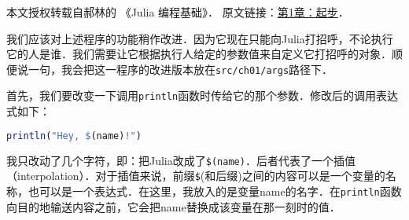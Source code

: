 
本文授权转载自郝林的 《Julia 编程基础》． 原文链接：\href{https://github.com/hyper0x/JuliaBasics/blob/master/book/ch01.md}{第1章：起步}．

我们应该对上述程序的功能稍作改进．因为它现在只能向Julia打招呼，不论执行它的人是谁．我们需要让它根据执行人给定的参数值来自定义它打招呼的对象．顺便说一句，我会把这一程序的改进版本放在\verb|src/ch01/args|路径下．

首先，我们要改变一下调用\verb|println|函数时传给它的那个参数．修改后的调用表达式如下：
\begin{lstlisting}[language=julia]
println("Hey, $(name)!")
\end{lstlisting}
我只改动了几个字符，即：把Julia改成了\verb|$(name)|．后者代表了一个插值（interpolation）．对于插值来说，前缀\verb|$|(和后缀)之间的内容可以是一个变量的名称，也可以是一个表达式．在这里，我放入的是变量name的名字．在\verb|println|函数向目的地输送内容之前，它会把name替换成该变量在那一刻时的值．
